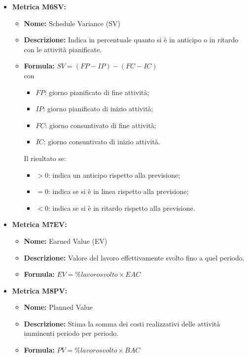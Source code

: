 \begin{itemize}
    \item \textbf{Metrica M6SV:}
          \begin{itemize}
              \item \textbf{Nome:} Schedule Variance (SV)
              \item \textbf{Descrizione:} Indica in percentuale quanto si è in anticipo o in ritardo con le attività pianificate.
              \item \textbf{Formula:} $SV = (FP - IP) - (FC - IC)$
              \\con \begin{itemize}
                \item $FP$: giorno pianificato di fine attività;
                \item $IP$: giorno pianificato di inizio attività;
                \item $FC$: giorno consuntivato di fine attività;
                \item $IC$: giorno consuntivato di inizio attività.
            \end{itemize}
            
            Il risultato se:
            \begin{itemize}
                \item $> 0$: indica un anticipo rispetto alla previsione;
                \item $= 0$: indica se si è in linea rispetto alla previsione;
                \item $< 0$: indica se si è in ritardo rispetto alla previsione.
            \end{itemize}
          \end{itemize}

    \item \textbf{Metrica M7EV:}
          \begin{itemize}
              \item \textbf{Nome:} Earned Value (EV)
              \item \textbf{Descrizione:} Valore del lavoro effettivamente svolto fino a quel periodo.
              \item \textbf{Formula:} $EV = \% lavoro svolto \times EAC$
          \end{itemize}

    \item \textbf{Metrica M8PV:}
          \begin{itemize}
              \item \textbf{Nome:} Planned Value
              \item \textbf{Descrizione:} Stima la somma dei costi realizzativi delle attività imminenti periodo per periodo.
              \item \textbf{Formula:} $PV = \% lavoro svolto \times BAC$
          \end{itemize}


\end{itemize}
